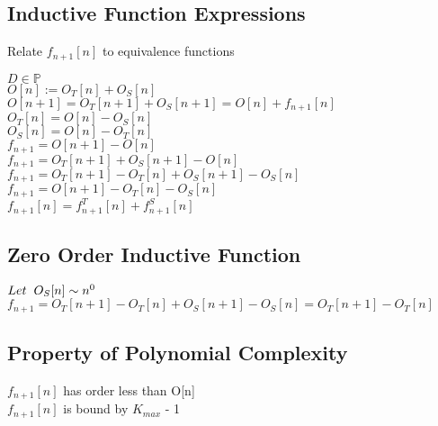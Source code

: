 \documentclass[11pt]{article}
\begin{document}
\subsection{Inductive Function Expressions}
Relate $f_{n+1}[n]$ to equivalence functions
\begin{center}
$
D \in \mathbb{P}
$
\\ \vspace{2mm}
$
O[n] := O_T[n] + O_S[n]
$
\\ \vspace{2mm}
$
O[n+1] = O_T[n+1] + O_S[n+1] = O[n] + f_{n+1}[n]
$
\\ \vspace{2mm}
$
O_T[n] = O[n] - O_S[n]
$
\\ \vspace{2mm}
$
O_S[n] = O[n] - O_T[n]
$
\\ \vspace{8mm}
$
f_{n+1} = O[n+1] - O[n]
$
\\ \vspace{2mm}
$
f_{n+1} = O_T[n+1] + O_S[n+1] - O[n]
$
\\ \vspace{2mm}
$
f_{n+1} = O_T[n+1] - O_T[n] + O_S[n+1] - O_S[n]
$
\\ \vspace{2mm}
$
f_{n+1} = O[n+1] - O_T[n] - O_S[n]
$
\\ \vspace{2mm}
$
f_{n+1}[n] =  f^T_{n+1}[n] +  f^S_{n+1}[n]
$
\end{center}






\subsection{Zero Order Inductive Function}
\begin{center}
$
Let \hspace{2mm} O_S[n] \sim n^0
$
\\ \vspace{2mm}
$
f_{n+1} = O_T[n+1] - O_T[n] + O_S[n+1] - O_S[n] = O_T[n+1] - O_T[n]
$
\end{center}


\subsection{Property of Polynomial Complexity}
$f_{n+1}[n]$ has order less than O[n]\\
$f_{n+1}[n]$ is bound by $K_{max}$ - 1
\end{document}
